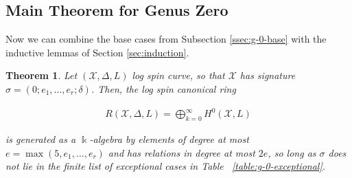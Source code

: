 \documentclass{amsart}
\theoremstyle{plain}
\newtheorem{thm}{Theorem}[section]
\theoremstyle{definition}
\theoremstyle{remark}
\numberwithin{equation}{section}
\newcommand\ssec{\subsection}
\newcommand\Bk{{\Bbbk}}
\newcommand\sx{\mathscr X}
\newcommand{\halfcan}{L}
\begin{document}
\ssec{Main Theorem for Genus Zero}
\label{ssec:g-0-main}
Now we can combine the base cases from Subsection \ref{ssec:g-0-base} with the inductive lemmas of Section \ref{sec:induction}.

\begin{thm}
\label{thm:g-0-main}
Let $(\sx, \Delta, \halfcan)$ log spin curve,
so that $\sx$ has signature $\sigma = (0; e_1, \ldots, e_r; \delta)$.
Then, the log spin canonical ring

\begin{align*}
	R(\sx, \Delta, \halfcan) = \bigoplus_{k = 0}^\infty H^0(\sx, L)
\end{align*}

\noindent
is generated as a $\Bk$-algebra by elements of degree at most $e =
\max(5, e_1, \ldots, e_r)$ and has relations in degree at most $2e$,
so long as $\sigma$ does not lie in the finite list of exceptional
cases in Table ~\ref{table:g-0-exceptional}.
\end{thm}
\end{document}

